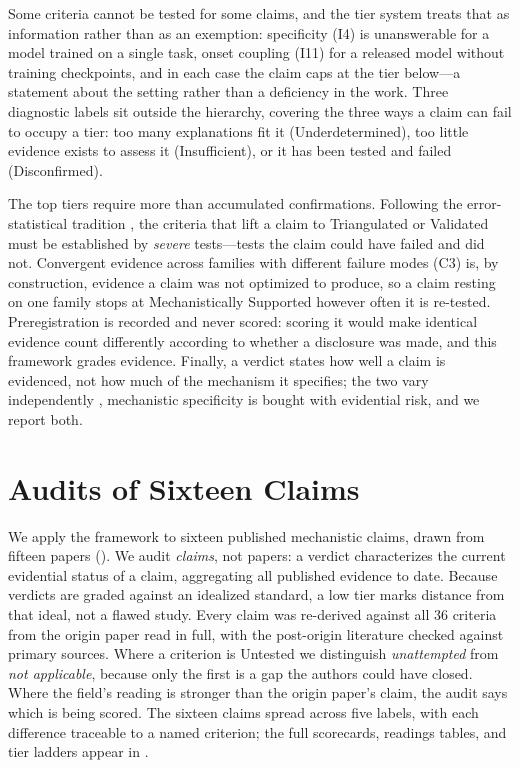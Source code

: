 \documentclass{article}
\begin{document}
Some criteria cannot be tested for some claims, and the tier system treats that as information rather than as an exemption: specificity (I4) is unanswerable for a model trained on a single task, onset coupling (I11) for a released model without training checkpoints, and in each case the claim caps at the tier below---a statement about the setting rather than a deficiency in the work. Three diagnostic labels sit outside the hierarchy, covering the three ways a claim can fail to occupy a tier: too many explanations fit it (Underdetermined), too little evidence exists to assess it (Insufficient), or it has been tested and failed (Disconfirmed).

The top tiers require more than accumulated confirmations. Following the error-statistical tradition \citep{mayo2018statistical}, the criteria that lift a claim to Triangulated or Validated must be established by \emph{severe} tests---tests the claim could have failed and did not. Convergent evidence across families with different failure modes (C3) is, by construction, evidence a claim was not optimized to produce, so a claim resting on one family stops at Mechanistically Supported however often it is re-tested. Preregistration is recorded and never scored: scoring it would make identical evidence count differently according to whether a disclosure was made, and this framework grades evidence. Finally, a verdict states how well a claim is evidenced, not how much of the mechanism it specifies; the two vary independently \citep{craver2006when}, mechanistic specificity is bought with evidential risk, and we report both.

\section{Audits of Sixteen Claims}
\label{sec:case-studies}

We apply the framework to sixteen published mechanistic claims, drawn from fifteen papers (). We audit \emph{claims}, not papers: a verdict characterizes the current evidential status of a claim, aggregating all published evidence to date. Because verdicts are graded against an idealized standard, a low tier marks distance from that ideal, not a flawed study. Every claim was re-derived against all 36 criteria from the origin paper read in full, with the post-origin literature checked against primary sources. Where a criterion is Untested we distinguish \emph{unattempted} from \emph{not applicable}, because only the first is a gap the authors could have closed. Where the field's reading is stronger than the origin paper's claim, the audit says which is being scored. The sixteen claims spread across five labels, with each difference traceable to a named criterion; the full scorecards, readings tables, and tier ladders appear in .
\end{document}
